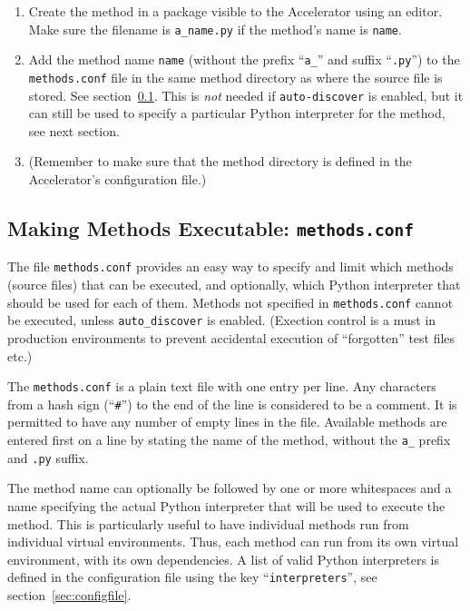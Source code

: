 \begin{enumerate}
\item Create the method in a package visible to the Accelerator
  using an editor.  Make sure the filename is \texttt{a\_name.py} if
  the method's name is \texttt{name}.
\item Add the method name \texttt{name} (without the prefix ``\texttt{a\_}'' and
  suffix ``\texttt{.py}'') to the \texttt{methods.conf} file in the
  same method directory as where the source file is stored.  See
  section~\ref{sec:methods_conf}.  This is \textsl{not} needed
  if \texttt{auto-discover} is enabled, but it can still be used to
  specify a particular Python interpreter for the method, see next
  section.
\item (Remember to make sure that the method directory is defined in the Accelerator's
  configuration file.)
\end{enumerate}


\subsection{Making Methods Executable:  \texttt{methods.conf}}
\label{sec:methods_conf}
The file \texttt{methods.conf} provides an easy way to specify and
limit which methods (source files) that can be executed, and
optionally, which Python interpreter that should be used for each of
them.  Methods not specified in \texttt{methods.conf} cannot be
executed, unless \texttt{auto\_discover} is enabled.  (Exection
control is a must in production environments to prevent accidental
execution of ``forgotten'' test files etc.)

The \texttt{methods.conf} is a plain text file with one entry per
line.  Any characters from a hash sign (``\texttt{\#}'') to the end of
the line is considered to be a comment.  It is permitted to have any
number of empty lines in the file.  Available methods are entered
first on a line by stating the name of the method, without the
\texttt{a\_} prefix and \texttt{.py} suffix.

The method name can optionally be followed by one or more whitespaces
and a name specifying the actual Python interpreter that will be used
to execute the method.  This is particularly useful to have individual
methods run from individual virtual environments.  Thus, each method
can run from its own virtual environment, with its own dependencies.
A list of valid Python interpreters is defined in the configuration
file using the key ``\texttt{interpreters}'', see
section~\ref{sec:configfile}.

